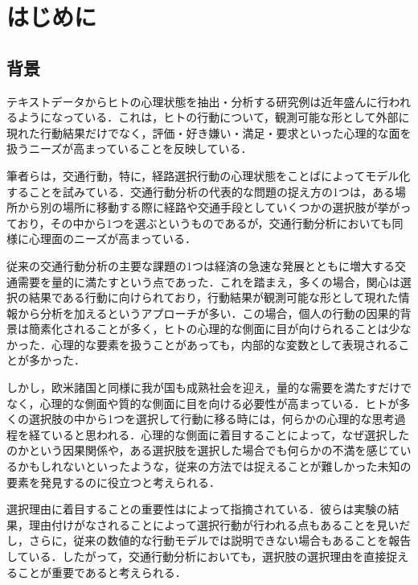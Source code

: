 \documentclass[japanese]{jnlp_1.3a}
\begin{document}
\maketitle






\section{はじめに}
\label{sec:hajimeni}

\subsection{背景}

テキストデータからヒトの心理状態を抽出・分析する研究例は近年盛んに行われるようになっている．これは，ヒトの行動について，観測可能な形として外部に現れた行動結果だけでなく，評価・好き嫌い・満足・要求といった心理的な面を扱うニーズが高まっていることを反映している．

筆者らは，交通行動，特に，経路選択行動の心理状態をことばによってモデル化することを試みている．交通行動分析の代表的な問題の捉え方の1つは，ある場所から別の場所に移動する際に経路や交通手段としていくつかの選択肢が挙がっており，その中から1つを選ぶというものであるが，交通行動分析においても同様に心理面のニーズが高まっている．

従来の交通行動分析の主要な課題の1つは経済の急速な発展とともに増大する交通需要を量的に満たすという点であった．これを踏まえ，多くの場合，関心は選択の結果である行動に向けられており，行動結果が観測可能な形として現れた情報から分析を加えるというアプローチが多い．この場合，個人の行動の因果的背景は簡素化される\cite{Fujii2002}ことが多く，ヒトの心理的な側面に目が向けられることは少なかった．心理的な要素を扱うことがあっても，内部的な変数として表現されることが多かった．

しかし，欧米諸国と同様に我が国も成熟社会を迎え，量的な需要を満たすだけでなく，心理的な側面や質的な側面に目を向ける必要性が高まっている．ヒトが多くの選択肢の中から1つを選択して行動に移る時には，何らかの心理的な思考過程を経ていると思われる．心理的な側面に着目することによって，なぜ選択したのかという因果関係や，ある選択肢を選択した場合でも何らかの不満を感じているかもしれないといったような，従来の方法では捉えることが難しかった未知の要素を発見するのに役立つと考えられる．

選択理由に着目することの重要性はによって指摘されている．彼らは実験の結果，理由付けがなされることによって選択行動が行われる点もあることを見いだし，さらに，従来の数値的な行動モデルでは説明できない場合もあることを報告している．したがって，交通行動分析においても，選択肢の選択理由を直接捉えることが重要であると考えられる．
\end{document}
